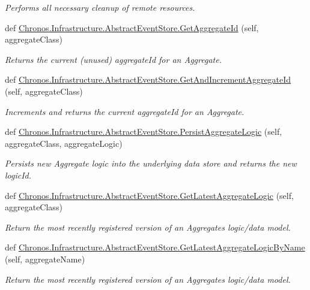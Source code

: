 \begin{DoxyCompactItemize}
\begin{DoxyCompactList}\small\item\em Performs all necessary cleanup of remote resources. \end{DoxyCompactList}\item 
def \hyperlink{group__Chronos_ga4a151ebe26b5a8046272920def464107}{Chronos.\+Infrastructure.\+Abstract\+Event\+Store.\+Get\+Aggregate\+Id} (self, aggregate\+Class)
\begin{DoxyCompactList}\small\item\em Returns the current (unused) aggregate\+Id for an Aggregate. \end{DoxyCompactList}\item 
def \hyperlink{group__Chronos_ga00579d86cc3a3a7805b76a202046765b}{Chronos.\+Infrastructure.\+Abstract\+Event\+Store.\+Get\+And\+Increment\+Aggregate\+Id} (self, aggregate\+Class)
\begin{DoxyCompactList}\small\item\em Increments and returns the current aggregate\+Id for an Aggregate. \end{DoxyCompactList}\item 
def \hyperlink{group__Chronos_gab6a37c0b1d871a0304f4e89fe8e35317}{Chronos.\+Infrastructure.\+Abstract\+Event\+Store.\+Persist\+Aggregate\+Logic} (self, aggregate\+Class, aggregate\+Logic)
\begin{DoxyCompactList}\small\item\em Persists new Aggregate logic into the underlying data store and returns the new logic\+Id. \end{DoxyCompactList}\item 
def \hyperlink{group__Chronos_gaac3c8acece5840e33d6ea383f60c1114}{Chronos.\+Infrastructure.\+Abstract\+Event\+Store.\+Get\+Latest\+Aggregate\+Logic} (self, aggregate\+Class)
\begin{DoxyCompactList}\small\item\em Return the most recently registered version of an Aggregate\textquotesingle{}s logic/data model. \end{DoxyCompactList}\item 
def \hyperlink{group__Chronos_gab524764c52a48bd4b924d7518ba35f4c}{Chronos.\+Infrastructure.\+Abstract\+Event\+Store.\+Get\+Latest\+Aggregate\+Logic\+By\+Name} (self, aggregate\+Name)
\begin{DoxyCompactList}\small\item\em Return the most recently registered version of an Aggregate\textquotesingle{}s logic/data model. \end{DoxyCompactList}\item 

\end{DoxyCompactItemize}
